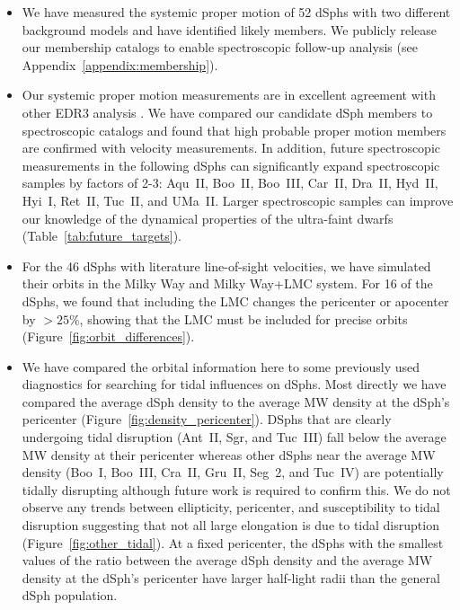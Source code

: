 \documentclass[twocolumn]{aastex63}
\begin{document}
\begin{itemize}

\item We have measured the systemic proper motion of 52 dSphs with two different background models and have identified likely members.   We publicly release  our membership catalogs to enable  spectroscopic follow-up analysis (see  Appendix~\ref{appendix:membership}).

\item Our systemic proper motion measurements are in excellent agreement with other EDR3 analysis \citep[e.g., ][]{McConnachie2020RNAAS...4..229M, Li2021ApJ...916....8L, Battaglia2022A&A...657A..54B}. We have compared our candidate dSph members to spectroscopic catalogs and found that  high probable  proper motion members are confirmed with velocity measurements. In addition, future spectroscopic measurements in the following dSphs can significantly expand spectroscopic samples by factors of 2-3: Aqu~II, Boo~II, Boo~III, Car~II, Dra~II, Hyd~II, Hyi~I, Ret~II, Tuc~II, and UMa~II. Larger spectroscopic samples can improve our knowledge of the dynamical properties of the ultra-faint dwarfs (Table~\ref{tab:future_targets}).

\item For the 46 dSphs with literature line-of-sight velocities, we have simulated their orbits in the Milky Way and Milky Way+LMC system. For 16 of the dSphs, we found that including the LMC changes the pericenter or apocenter by $>25\%$, showing that the LMC must be included for precise orbits (Figure~\ref{fig:orbit_differences}). 

\item We have compared the orbital information here to some previously used diagnostics for searching for tidal influences on dSphs.
Most directly we have compared the average dSph density to the average MW density at the dSph's pericenter (Figure~\ref{fig:density_pericenter}).  DSphs that are clearly undergoing tidal disruption (Ant~II,  Sgr, and Tuc~III) fall below the average MW density at their pericenter whereas other dSphs near  the average MW density (Boo~I, Boo~III, Cra~II, Gru~II, Seg~2, and Tuc~IV) are potentially tidally disrupting although future work is required to confirm this. 
We do not observe any trends between ellipticity, pericenter, and susceptibility to tidal disruption suggesting that not all large elongation is due to tidal disruption (Figure~\ref{fig:other_tidal}). 
At a fixed pericenter, the dSphs with the smallest values of the ratio between the average dSph density and the average MW density at the dSph's pericenter have larger half-light radii than the general dSph population.


\end{itemize}
\end{document}
